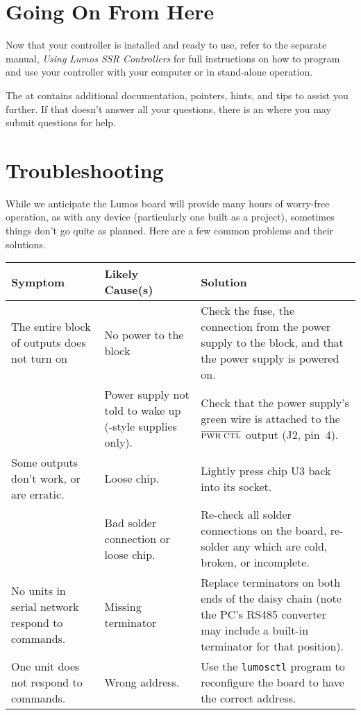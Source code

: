 \documentclass[letterpaper,twoside,onecolumn,openright,final]{memoir}
\begin{document}
\chapter{Going On From Here}
Now that your controller is installed and ready to use, refer to the separate manual,
\emph{Using Lumos SSR Controllers} for full instructions on how to program
and use your controller with your computer or in stand-alone operation.

The  at  contains additional documentation,
pointers, hints, and tips to assist you further.  If that doesn't answer all your questions,
there is an  where you may submit questions for help.

\backmatter
\appendix



\chapter{Troubleshooting}\label{ch:troubleshooting}
While we anticipate the Lumos board will provide many hours of worry-free operation,
as with any device (particularly one built as a  project), sometimes things don't go
quite as planned.  Here are a few common problems and their solutions.

\begin{longtable}{|p{1.5in}|p{1.5in}|p{2in}|}\hline
\bfseries Symptom & \bfseries Likely Cause(s) & \bfseries Solution \\\hline\hline
\endhead
The entire block of outputs does not turn on 
	& No power to the block 
	& Check the fuse,
	  the connection from the power supply to the block, and that the power supply is powered on.\\
\cline{2-3}
	& Power supply not told to wake up (\mc{ATX}-style supplies only).
	& Check that the power supply's green wire is attached to the $\overline{\hbox{\mc{PWR CTL}}}$
	  output (J2, pin~4). \\\hline
Some outputs don't work, or are erratic.
	& Loose %
chip.
	& Lightly press chip U3 back into its socket.\\
\cline{2-3}
	& Bad solder connection or loose chip.
	& Re-check all solder connections on the board, re-solder any which are cold, broken, or
	  incomplete.\\\hline
No units in serial network respond to commands.
	& Missing terminator
	& Replace terminators on both ends of the daisy chain (note the PC's RS485 converter
	  may include a built-in terminator for that position).\\\hline
One unit does not respond to commands.
	& Wrong address.
	& Use the \verb+lumosctl+ program to reconfigure the board to have
	  the correct address.\\\hline
\end{longtable}
\end{document}
